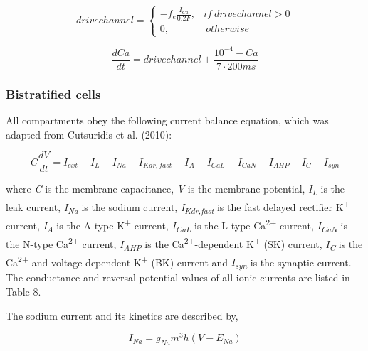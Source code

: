 \documentclass[12pt]{article}
\begin{document}
\begin{equation}
drivechannel = \begin{cases} -f_e \frac{I_{Ca}}{0.2 F}, & if \ drivechannel > 0  \\ 0, & \  otherwise \ \end{cases}
\end{equation}

\begin{equation}
\frac{dCa}{dt}=drivechannel +\frac{10^{-4}-Ca}{7\cdot 200 ms}
\end{equation}




\bigskip

\subsubsection{Bistratified cells}

All compartments obey the following current balance equation, which was adapted from Cutsuridis et al. (2010):


\begin{equation}
C\frac{dV}{dt}=I_{ext}-I_L-I_{Na}-I_{Kdr, fast}-I_A-I_{CaL}-I_{CaN}-I_{AHP}-I_C-I_{syn}
\end{equation}


where \textit{C} is the membrane capacitance, \textit{V} is the membrane potential, \textit{I}\textit{\textsubscript{L}}
is the leak current, \textit{I}\textit{\textsubscript{Na}} is the sodium current,
\textit{I}\textit{\textsubscript{Kdr,fast}} is the fast delayed rectifier K\textsuperscript{+} current,
\textit{I}\textit{\textsubscript{A}} is the A-type K\textsuperscript{+} current, \textit{I}\textit{\textsubscript{CaL}}
is the L-type Ca\textsuperscript{2+} current, \textit{I}\textit{\textsubscript{CaN}} is the N-type
Ca\textsuperscript{2+} current, \textit{I}\textit{\textsubscript{AHP}} is the Ca\textsuperscript{2+}-dependent
K\textsuperscript{+} (SK) current, \textit{I}\textit{\textsubscript{C}} is the Ca\textsuperscript{2+} and
voltage-dependent K\textsuperscript{+} (BK) current and \textit{I}\textit{\textsubscript{syn}} is the synaptic current.
The conductance and reversal potential values of all ionic currents are listed in Table 8. \ \ 



The sodium current and its kinetics are described by,


\begin{equation}
I_{Na}=g_{Na} m^3 h (V-E_{Na})
\end{equation}
\end{document}
